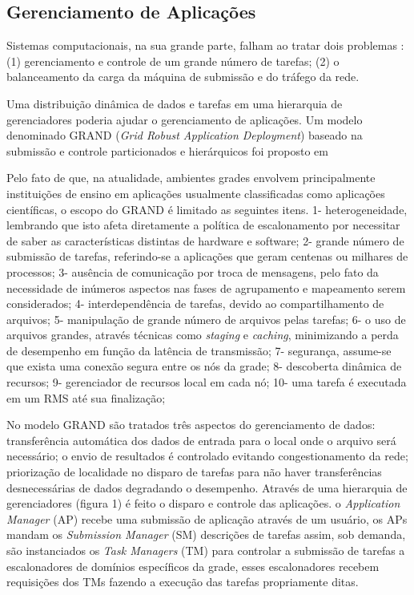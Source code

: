 \subsection{Gerenciamento de Aplicações}

Sistemas computacionais, na sua grande parte, falham ao tratar dois problemas \cite{Mangan2006}: (1) gerenciamento e controle de um grande número de tarefas; (2) o balanceamento da carga da máquina de submissão e do tráfego da rede.

Uma distribuição dinâmica de dados e tarefas em uma hierarquia de gerenciadores poderia ajudar o gerenciamento de aplicações. Um modelo denominado GRAND (\emph{Grid Robust Application Deployment}) baseado na submissão e controle particionados e hierárquicos foi proposto em \cite{Mangan2006}

Pelo fato de que, na atualidade, ambientes grades envolvem principalmente instituições de ensino em aplicações usualmente classificadas como aplicações científicas, o escopo do GRAND é limitado as seguintes itens. 1- heterogeneidade, lembrando que isto afeta diretamente a política de escalonamento por necessitar de saber as características distintas de hardware e software; 2- grande número de submissão de tarefas, referindo-se a aplicações que geram centenas ou milhares de processos; 3- ausência de comunicação por troca de mensagens, pelo fato da necessidade de inúmeros aspectos nas fases de agrupamento e mapeamento serem considerados; 4- interdependência de tarefas, devido ao compartilhamento de arquivos; 5- manipulação de grande número de arquivos pelas tarefas; 6- o uso de arquivos grandes, através técnicas como \emph{staging} e \emph{caching}, minimizando a perda de desempenho em função da latência de transmissão; 7- segurança, assume-se que exista uma conexão segura entre os nós da grade; 8- descoberta dinâmica de recursos; 9- gerenciador de recursos local em cada nó; 10- uma tarefa é executada em um RMS até sua finalização;

No modelo GRAND são tratados três aspectos do gerenciamento de dados: transferência automática dos dados de entrada para o local onde o arquivo será necessário; o envio de resultados é controlado evitando congestionamento da rede; priorização de localidade no disparo de tarefas para não haver transferências desnecessárias de dados degradando o desempenho. Através de uma hierarquia de gerenciadores (figura 1) é feito o disparo e controle das aplicações. o \emph{Application Manager} (AP) recebe uma submissão de aplicação através de um usuário, os APs mandam os \emph{Submission Manager} (SM) descrições de tarefas assim, sob demanda, são instanciados os \emph{Task Managers} (TM) para controlar a submissão de tarefas a escalonadores de domínios específicos da grade, esses escalonadores recebem requisições dos TMs fazendo a execução das tarefas propriamente ditas.

